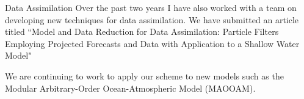 \documentclass[aspectratio=169,handout]{beamer}
\begin{document}
\begin{frame}{Data Assimilation}
\vfill
Over the past two years I have also worked with a team on developing new techniques for data assimilation. We have submitted an article titled
``Model and Data Reduction for Data Assimilation: Particle Filters Employing Projected Forecasts and Data with Application to a Shallow Water Model"

We are continuing to work to apply our scheme to new models such as the Modular Arbitrary-Order Ocean-Atmospheric Model (MAOOAM).
\vfill
\end{frame}
\end{document}
